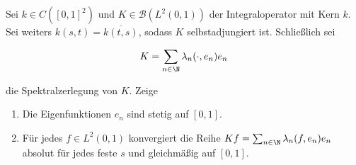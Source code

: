 \begin{exercise}[37/1]

Sei $k \in C([0, 1]^2)$ und $K \in \mathcal{B}(L^2(0, 1))$ der Integraloperator mit Kern $k$.
Sei weiters $k(s, t) = \overline{k(t, s)}$, sodass $K$ selbstadjungiert ist.
Schließlich sei

\begin{align*}
  K
  =
  \sum_{n \in \N}
  \lambda_n
  (\cdot, e_n)
  e_n
\end{align*}

die Spektralzerlegung von $K$.
Zeige

\begin{enumerate}[label = (\alph*)]

  \item
  Die Eigenfunktionen $e_n$ sind stetig auf $[0, 1]$.

  \item
  Für jedes $f \in L^2(0, 1)$ konvergiert die Reihe $K f = \sum_{n \in \N} \lambda_n (f, e_n) e_n$ absolut für jedes feste $s$ und gleichmäßig auf $[0, 1]$.

\end{enumerate}

\end{exercise}

